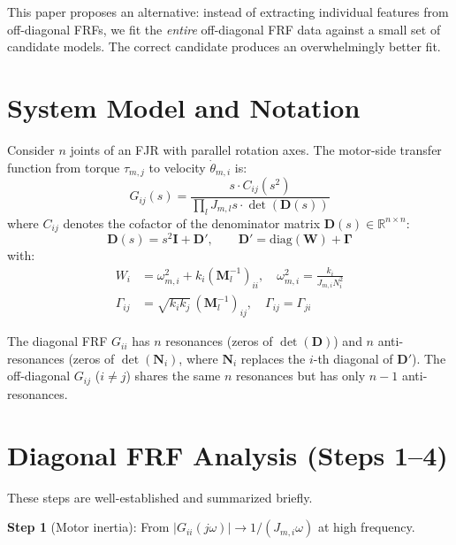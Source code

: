 \documentclass[10pt,twocolumn]{article}
\newcommand{\diag}{\mathrm{diag}}
\newcommand{\R}{\mathbb{R}}
\begin{document}
This paper proposes an alternative: instead of extracting individual features from off-diagonal FRFs, we fit the \emph{entire} off-diagonal FRF data against a small set of candidate models. The correct candidate produces an overwhelmingly better fit.

\section{System Model and Notation}

Consider $n$ joints of an FJR with parallel rotation axes. The motor-side transfer function from torque $\tau_{m,j}$ to velocity $\dot{\theta}_{m,i}$ is:
\begin{equation}
G_{ij}(s) = \frac{s \cdot C_{ij}(s^2)}{\prod_l J_{m,l} s \cdot \det(\bm{D}(s))}
\label{eq:Gij}
\end{equation}
where $C_{ij}$ denotes the cofactor of the denominator matrix $\bm{D}(s) \in \R^{n \times n}$:
\begin{equation}
\bm{D}(s) = s^2 \bm{I} + \bm{D}', \qquad
\bm{D}' = \diag(\bm{W}) + \bm{\Gamma}
\label{eq:Dprime}
\end{equation}
with:
\begin{align}
W_i &= \omega_{m,i}^2 + k_i (\bm{M}_l^{-1})_{ii}, \quad
\omega_{m,i}^2 = \frac{k_i}{J_{m,i} N_i^2} \label{eq:Wi}\\
\Gamma_{ij} &= \sqrt{k_i k_j}\,(\bm{M}_l^{-1})_{ij}, \quad \Gamma_{ij} = \Gamma_{ji} \label{eq:Gamma}
\end{align}

The diagonal FRF $G_{ii}$ has $n$ resonances (zeros of $\det(\bm{D})$) and $n$ anti-resonances (zeros of $\det(\bm{N}_i)$, where $\bm{N}_i$ replaces the $i$-th diagonal of $\bm{D}'$). The off-diagonal $G_{ij}$ ($i \neq j$) shares the same $n$ resonances but has only $n{-}1$ anti-resonances.

\section{Diagonal FRF Analysis (Steps 1--4)}
\label{sec:diag}

These steps are well-established and summarized briefly.

\textbf{Step 1} (Motor inertia): From $|G_{ii}(j\omega)| \to 1/(J_{m,i} \omega)$ at high frequency.
\end{document}
